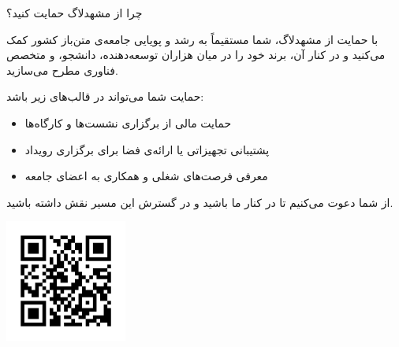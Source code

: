 \documentclass[a4paper]{article}
\begin{document}
چرا از مشهدلاگ حمایت کنید؟

با حمایت از مشهدلاگ، شما مستقیماً به رشد و پویایی جامعه‌ی متن‌باز کشور کمک می‌کنید و در کنار آن، برند خود را در میان هزاران توسعه‌دهنده، دانشجو، و متخصص فناوری مطرح می‌سازید.

حمایت شما می‌تواند در قالب‌های زیر باشد:

\begin{itemize}
\item حمایت مالی از برگزاری نشست‌ها و کارگاه‌ها
\item پشتیبانی تجهیزاتی یا ارائه‌ی فضا برای برگزاری رویداد
\item معرفی فرصت‌های شغلی و همکاری به اعضای جامعه
\end{itemize}

از شما دعوت می‌کنیم تا در کنار ما باشید و در گسترش این مسیر نقش داشته باشید.

\vspace{0.6cm}

\includegraphics[width=4cm]{assets/qrcode.png}
\end{document}
